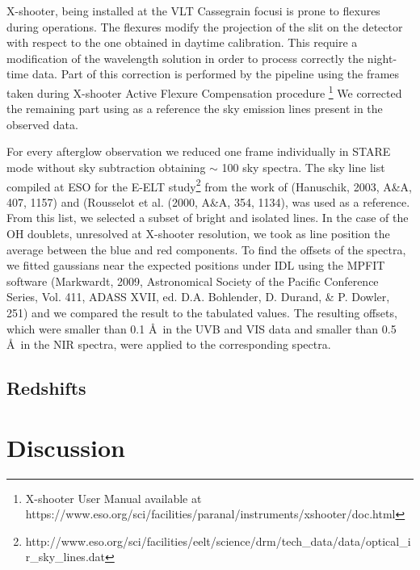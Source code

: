 \documentclass[iop, twocolappendix, numberedappendix, tighten, appendixfloats]{emulateapj}
\begin{document}
	X-shooter, being installed at the VLT Cassegrain focusi is  prone to
	flexures during operations. The flexures modify the projection of the slit
	on the detector with respect to the one obtained in daytime calibration. 
	This require a modification of the wavelength solution in order to
	process correctly the night-time data. Part of this correction
	is performed by the pipeline using the frames taken
	during X-shooter Active Flexure Compensation procedure
	\footnote{X-shooter User Manual available at https://www.eso.org/sci/facilities/paranal/instruments/xshooter/doc.html}
	We corrected the remaining part using as a reference the sky
	emission lines present in the observed data.
	
	
	For every afterglow observation we reduced one frame individually in STARE mode without
	sky subtraction obtaining $\sim$ 100 sky spectra. The sky line list compiled at ESO for
	the E-ELT
	study\footnote{http://www.eso.org/sci/facilities/eelt/science/drm/tech\_data/data/optical\_ir\_sky\_lines.dat}
	from the work of (Hanuschik, 2003, A\&A, 407, 1157) and (Rousselot et al. (2000, A\&A, 354, 1134), was used as a reference.
	From this list, we selected a subset of bright and isolated lines. In the case of the OH doublets, unresolved at X-shooter resolution, we took as line position the average between the blue and red components. To find the offsets of the spectra, we fitted gaussians near the
	expected positions under IDL using the MPFIT software (Markwardt, 2009, Astronomical Society of the Pacific Conference Series, Vol. 411, ADASS XVII, ed. D.A. Bohlender, D. Durand, \& P. Dowler, 251) and we compared the result to the tabulated values.
	The resulting offsets, which were smaller than 0.1 \AA~in the UVB and VIS data
	and smaller than 0.5 \AA~in the NIR spectra, were applied to the corresponding spectra.
	
	\subsection{Redshifts}
	
	\section{Discussion}
	
\end{document}
